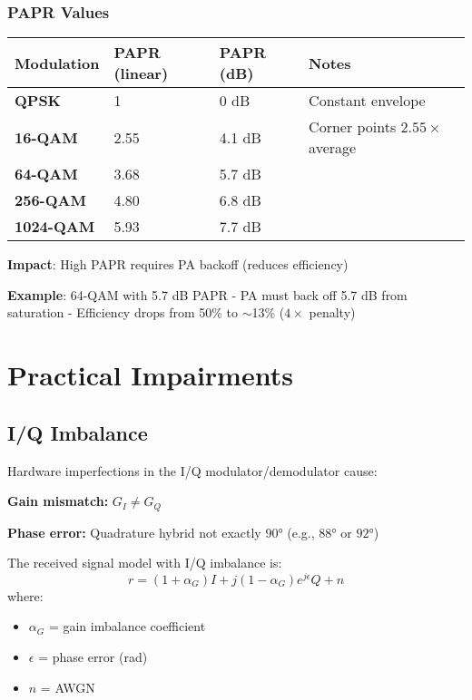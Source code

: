 \subsubsection{PAPR Values}\label{papr-values}

{\def\LTcaptype{} %
\begin{longtable}[]{@{}llll@{}}
\toprule\noalign{}
Modulation & PAPR (linear) & PAPR (dB) & Notes \\
\midrule\noalign{}
\endhead
\bottomrule\noalign{}
\endlastfoot
\textbf{QPSK} & 1 & 0 dB & Constant envelope \\
\textbf{16-QAM} & 2.55 & 4.1 dB & Corner points $2.55\times$ average \\
\textbf{64-QAM} & 3.68 & 5.7 dB & \\
\textbf{256-QAM} & 4.80 & 6.8 dB & \\
\textbf{1024-QAM} & 5.93 & 7.7 dB & \\
\end{longtable}
}

\textbf{Impact}: High PAPR requires PA backoff (reduces efficiency)

\textbf{Example}: 64-QAM with 5.7 dB PAPR - PA must back off 5.7 dB from saturation - Efficiency drops from 50\% to $\sim$13\% ($4\times$ penalty)

\section{Practical Impairments}

\subsection{I/Q Imbalance}

Hardware imperfections in the I/Q modulator/demodulator cause:

\textbf{Gain mismatch:} $G_I \neq G_Q$

\textbf{Phase error:} Quadrature hybrid not exactly $90°$ (e.g., $88°$ or $92°$)

The received signal model with I/Q imbalance is:
\begin{equation}
r = (1 + \alpha_G) I + j(1 - \alpha_G) e^{j\epsilon} Q + n
\label{eq:iq-imbalance}
\end{equation}
where:
\begin{itemize}
\item $\alpha_G$ = gain imbalance coefficient
\item $\epsilon$ = phase error (rad)
\item $n$ = AWGN
\end{itemize}

